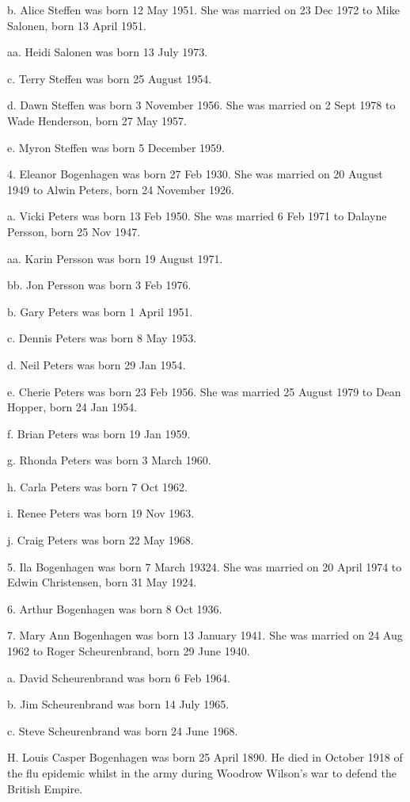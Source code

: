 \documentclass[a4paper]{article}
\begin{document}
b. Alice Steffen was born 12 May 1951.  She was married on 23 Dec 1972 to Mike Salonen, born 13 April 1951.
 
aa. Heidi Salonen was born 13 July 1973.

c. Terry Steffen was born 25 August 1954.

d. Dawn Steffen was born 3 November 1956.  She was married on 2 Sept 1978 to Wade Henderson, born 27 May 1957.
 
e. Myron Steffen was born 5 December 1959.
 
4. Eleanor Bogenhagen was born 27 Feb 1930.  She was married on 20 August 1949 to Alwin Peters, born 24 November 1926.  
 
a. Vicki Peters was born 13 Feb 1950.  She was married 6 Feb 1971 to Dalayne Persson, born 25 Nov 1947.
 
aa. Karin Persson was born 19 August 1971.

bb. Jon Persson was born 3 Feb 1976.

b. Gary Peters was born 1 April 1951.

c. Dennis Peters was born 8 May 1953.

d. Neil Peters was born 29 Jan 1954.

e. Cherie Peters was born 23 Feb 1956.  She was married 25 August 1979 to Dean Hopper, born 24 Jan 1954.
 
f. Brian Peters was born 19 Jan 1959.

g. Rhonda Peters was born 3 March 1960.

h. Carla Peters was born 7 Oct 1962.

i. Renee Peters was born 19 Nov 1963.

j. Craig Peters was born 22 May 1968.

5. Ila Bogenhagen was born 7 March 19324.  She was married on 20 April 1974 to Edwin Christensen, born 31 May 1924.
 
6. Arthur Bogenhagen was born 8 Oct 1936.

7. Mary Ann Bogenhagen was born 13 January 1941.  She was married on 24 Aug 1962 to Roger Scheurenbrand, born 29 June 1940.
 
a. David Scheurenbrand was born 6 Feb 1964.

b. Jim Scheurenbrand was born 14 July 1965.

c. Steve Scheurenbrand was born 24 June 1968.

H. Louis Casper Bogenhagen was born 25 April 1890.  He died in October 1918 of the flu epidemic whilst in the army during Woodrow Wilson's war to defend the British Empire.
 
\end{document}
